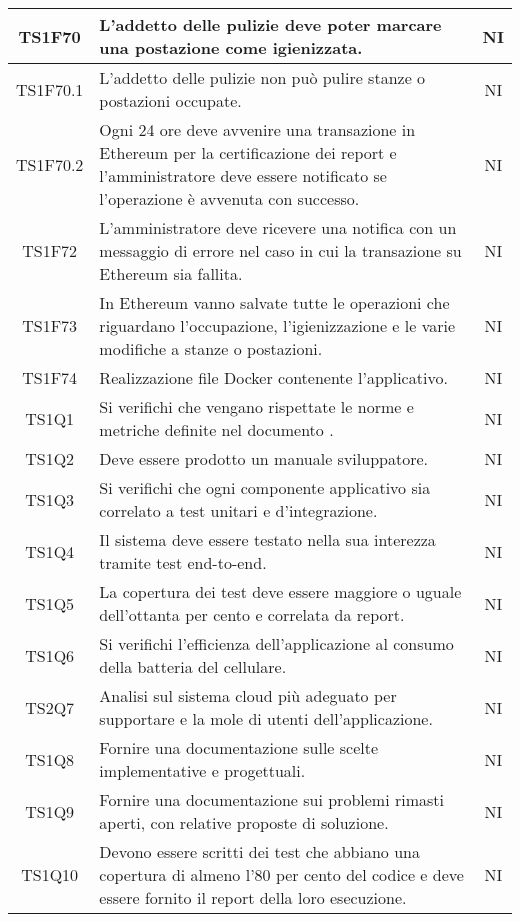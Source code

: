 \begin{center}
\begin{longtable}{|c|p{10cm}|c|}
			\hline
			TS1F70 & L'addetto delle pulizie deve poter marcare una postazione come igienizzata. & NI \\	
			\hline
			TS1F70.1 & L'addetto delle pulizie non può pulire stanze o postazioni occupate. & NI \\	
			\hline
			TS1F70.2 & Ogni 24 ore deve avvenire una transazione in Ethereum per la certificazione dei report e l'amministratore deve essere notificato se l'operazione è avvenuta con successo. & NI \\	
			\hline			
			TS1F72 & L’amministratore deve ricevere una notifica con un messaggio di errore nel caso in cui la transazione su Ethereum sia fallita. & NI \\	
			\hline						
			TS1F73& In Ethereum vanno salvate tutte le operazioni che riguardano l'occupazione, l'igienizzazione e le varie modifiche a stanze o postazioni. & NI \\	
			\hline
			TS1F74 & Realizzazione file Docker contenente l'applicativo. & NI \\	
			\hline
			TS1Q1 & Si verifichi che vengano rispettate le norme e metriche definite nel documento \dext{Piano di qualifica v. 2.0.0}. & NI \\	
			\hline			
			TS1Q2 & Deve essere prodotto un manuale sviluppatore. & NI \\	
			\hline	
			TS1Q3 & Si verifichi che ogni componente applicativo sia correlato a test unitari e d'integrazione. & NI \\	
			\hline
			TS1Q4 & Il sistema deve essere testato nella sua interezza tramite test end-to-end. & NI \\	
			\hline
			TS1Q5 & La copertura dei test deve essere maggiore o uguale dell'ottanta per cento e correlata da report. & NI \\	
			\hline
			TS1Q6 & Si verifichi l'efficienza dell'applicazione al consumo della batteria del cellulare. & NI \\	
			\hline
			TS2Q7 & Analisi sul sistema cloud più adeguato per supportare e la mole di utenti dell'applicazione. & NI \\	
			\hline
			TS1Q8 & Fornire una documentazione sulle scelte implementative e progettuali. & NI \\	
			\hline
			TS1Q9 & Fornire una documentazione sui problemi rimasti aperti, con relative proposte di soluzione. & NI \\	
			\hline
			TS1Q10 & Devono essere scritti dei test che abbiano una copertura di almeno l'80 per cento del codice e deve essere fornito il report della loro esecuzione. & NI \\	

\end{longtable}
\end{center}
